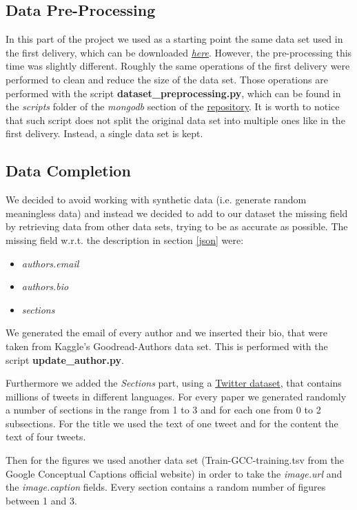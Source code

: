 \documentclass{Configuration_Files/PoliMi3i_thesis}
\begin{document}
\subsection{Data Pre-Processing}
In this part of the project we used as a starting point the same data set used in the first delivery, which can be downloaded \href{https://lfs.aminer.cn/misc/dblp.v11.zip}{\textit{here}}. 
However, the pre-processing this time was slightly different. 
Roughly the same operations of the first delivery were performed to clean and reduce the size of the data set. Those operations are performed with the script \textbf{dataset\_preprocessing.py}, which can be found in the \textit{scripts} folder of the \textit{mongodb} section of the \href{https://github.com/albertopirillo/smbud-project-2022}{repository}.
It is worth to notice that such script does not split the original data set into multiple ones like in the first delivery. Instead, a single data set is kept.

\subsection{Data Completion}
We decided to avoid working with synthetic data (i.e. generate random meaningless data) and instead we decided to add to our dataset the missing field by retrieving data from other data sets, trying to be as accurate as possible. The missing field w.r.t. the description in section \ref{json} were:
\begin{itemize} 
    \item \textit{authors.email}
    \item \textit{authors.bio}
    \item \textit{sections}
\end{itemize}

We generated the email of every author and we inserted their bio, that were taken from Kaggle's Goodread-Authors data set. This is performed with the script \textbf{update\_author.py}.

Furthermore we added the \textit{Sections} part, using a  \href{https://transparency.twitter.com/en/reports/moderation-research.html}{Twitter dataset}, that contains millions of tweets in different languages. For every paper we generated randomly a number of sections in the range from 1 to 3 and for each one from 0 to 2 subsections. For the title we used the text of one tweet and for the content the text of four tweets.

Then for the figures we used another data set (Train-GCC-training.tsv from the Google Conceptual Captions official website) in order to take the \textit{image.url} and the \textit{image.caption} fields. Every section contains a random number of figures between 1 and 3.
\end{document}
